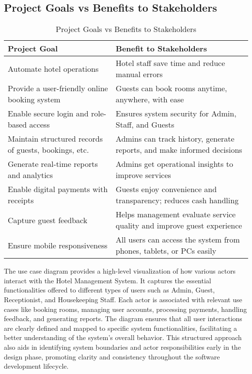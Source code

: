\documentclass[a4paper,12pt]{article}
\begin{document}
\subsection{Project Goals vs Benefits to Stakeholders}

\begin{table}[H]
\centering
\begin{tabularx}{\textwidth}{|X|X|}
\hline
\textbf{Project Goal} & \textbf{Benefit to Stakeholders} \\
\hline
Automate hotel operations & Hotel staff save time and reduce manual errors \\
\hline
Provide a user-friendly online booking system & Guests can book rooms anytime, anywhere, with ease \\
\hline
Enable secure login and role-based access & Ensures system security for Admin, Staff, and Guests \\
\hline
Maintain structured records of guests, bookings, etc. & Admins can track history, generate reports, and make informed decisions \\
\hline
Generate real-time reports and analytics & Admins get operational insights to improve services \\
\hline
Enable digital payments with receipts & Guests enjoy convenience and transparency; reduces cash handling \\
\hline
Capture guest feedback & Helps management evaluate service quality and improve guest experience \\
\hline
Ensure mobile responsiveness & All users can access the system from phones, tablets, or PCs easily \\
\hline
\end{tabularx}
\caption{Project Goals vs Benefits to Stakeholders}
\end{table}

The use case diagram provides a high-level visualization of how various actors interact with the Hotel Management System. It captures the essential functionalities offered to different types of users such as Admin, Guest, Receptionist, and Housekeeping Staff. Each actor is associated with relevant use cases like booking rooms, managing user accounts, processing payments, handling feedback, and generating reports. The diagram ensures that all user interactions are clearly defined and mapped to specific system functionalities, facilitating a better understanding of the system’s overall behavior. This structured approach also aids in identifying system boundaries and actor responsibilities early in the design phase, promoting clarity and consistency throughout the software development lifecycle.
\end{document}
